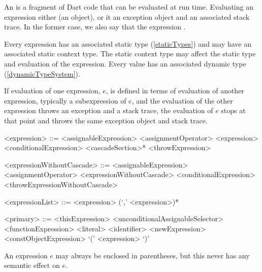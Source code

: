 \documentclass[makeidx]{article}
\begin{document}
\LMHash{}%
\label{evaluation}
An  is a fragment of Dart code that can be evaluated at run time.
Evaluating an expression either
(an object),
or it
an exception object and an associated stack trace.
In the former case, we also say that the expression
.

\LMHash{}%
Every expression has an associated static type (\ref{staticTypes}) and
may have an associated static context type.
The static context type may affect the static type and evaluation
of the expression.
Every value has an associated dynamic type (\ref{dynamicTypeSystem}).

\LMHash{}%
If evaluation of one expression, $e$, is defined in terms of evaluation of another expression, typically a subexpression of $e$,
and the evaluation of the other expression throws an exception and a stack trace,
the evaluation of $e$ stops at that point and throws the same exception object and stack trace.

\begin{grammar}
<expression> ::= <assignableExpression> <assignmentOperator> <expression>
  \alt <conditionalExpression> <cascadeSection>*
  \alt <throwExpression>

<expressionWithoutCascade> ::= <assignableExpression> <assignmentOperator>
  \gnewline{} <expressionWithoutCascade>
  \alt <conditionalExpression>
  \alt <throwExpressionWithoutCascade>

<expressionList> ::= <expression> (`,' <expression>)*

<primary> ::= <thisExpression>
  \alt \SUPER{} <unconditionalAssignableSelector>
  \alt <functionExpression>
  \alt <literal>
  \alt <identifier>
  \alt <newExpression>
  \alt <constObjectExpression>
  \alt `(' <expression> `)'
\end{grammar}

\LMHash{}%
An expression $e$ may always be enclosed in parentheses, but this never has any semantic effect on $e$.

\end{document}
